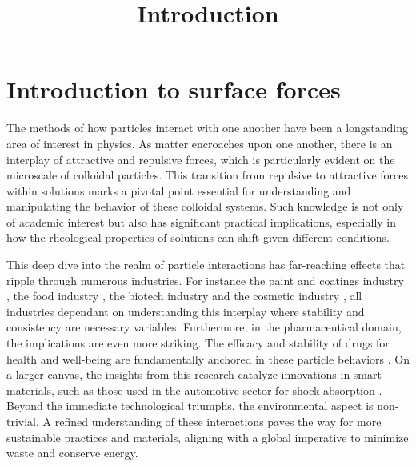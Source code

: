 

\chapter{Introduction to surface forces}





 
\title{Introduction}

The methods of how particles interact with one another have been a longstanding area of interest in physics. As matter encroaches upon one another, there is an interplay of attractive and repulsive forces, which is particularly evident on the microscale of colloidal particles. This transition from repulsive to attractive forces within solutions marks a pivotal point essential for understanding and manipulating the behavior of these colloidal systems. Such knowledge is not only of academic interest but also has significant practical implications, especially in how the rheological properties of solutions can shift given different conditions.

This deep dive into the realm of particle interactions has far-reaching effects that ripple through numerous industries. For instance the paint and coatings industry \cite{funnypaint}, the food industry \cite{funnyfood}, the biotech industry \cite{pichot2004surface} and the cosmetic industry \cite{funnymakeup}, all industries dependant on understanding this interplay where stability and consistency are necessary variables. Furthermore, in the pharmaceutical domain, the implications are even more striking. The efficacy and stability of drugs for health and well-being are fundamentally anchored in these particle behaviors \cite{funnypharm}. On a larger canvas, the insights from this research catalyze innovations in smart materials, such as those used in the automotive sector for shock absorption \cite{funnyshock}. Beyond the immediate technological triumphs, the environmental aspect is non-trivial. A refined understanding of these interactions paves the way for more sustainable practices and materials, aligning with a global imperative to minimize waste and conserve energy. 

